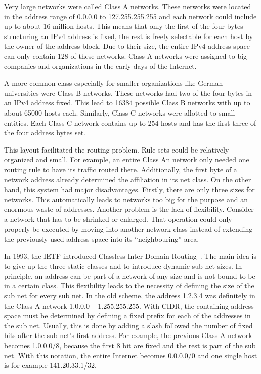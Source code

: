 \documentclass[a4paper,
		12pt,
		parskip=full,
		titlepage
		]{scrartcl}
\begin{document}
Very large networks were called Class A networks.
These networks were located in the address range of 0.0.0.0 to 127.255.255.255 and each network could include up to about 16 million hosts.
This means that only the first of the four bytes structuring an IPv4 address 
is fixed, the rest is freely selectable for each host by the owner of the address block.
Due to their size, the entire IPv4 address space can only contain 128 of these networks.
Class A networks were assigned to big companies and organizations in the early days of the Internet.

A more common class especially for smaller organizations like German universities were Class B networks.
These networks had two of the four bytes in an IPv4 address fixed.
This lead to 16384 possible Class B networks with up to about 65000 hosts each.
Similarly, Class C networks were allotted to small entities.
Each Class C network contains up to 254 hosts and has the first three of the four address bytes set.

This layout facilitated the routing problem.
Rule sets could be relatively organized and small.
For example, an entire Class An network only needed one routing rule to have its traffic routed there.
Additionally, the first byte of a network address already determined the affiliation in its net class.
On the other hand, this system had major disadvantages.
Firstly, there are only three sizes for networks.
This automatically leads to networks too big for the purpose and an enormous waste of addresses.
Another problem is the lack of flexibility.
Consider a network that has to be shrinked or enlarged.
That operation could only properly be executed by moving into another network class instead of extending the 
previously used address space into its \enquote{neighbouring} area.

In 1993, the IETF introduced Classless Inter Domain Routing~\cite{rfc1518, rfc4632}.
The main idea is to give up the three static classes and to introduce dynamic sub net sizes.
In principle, an address can be part of a network of any size and is not bound to be in a certain class.
This flexibility leads to the necessity of defining the size of the sub net for every sub net.
In the old scheme, the address 1.2.3.4 was definitely in the Class A network 1.0.0.0 -- 1.255.255.255.
With CIDR, the containing address space must be determined by defining a fixed prefix for each of the addresses in the sub net.
Usually, this is done by adding a slash followed the number of fixed bits after the sub net's first address.
For example, the previous Class A network becomes 1.0.0.0/8, because the first 8 bit are fixed and the rest is part of the sub net.
With this notation, the entire Internet becomes 0.0.0.0/0 and one single host is for example 141.20.33.1/32.
\end{document}
